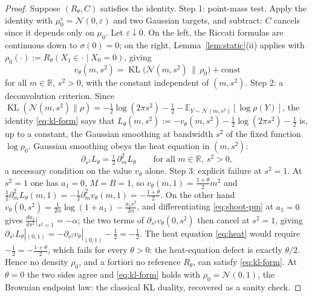 \documentclass[letterpaper,10pt,conference]{IEEEtran}
\newcommand{\KL}{\operatorname{KL}}
\newcommand{\EE}{\mathbb{E}}
\newcommand{\RR}{\mathbb{R}}
\newcommand{\cN}{\mathcal{N}}
\begin{document}
	\begin{proof}
		Suppose $(R_\theta,C)$ satisfies the identity. {Step 1: point-mass
			test.} Apply the identity with $\mu_0^\varepsilon=\cN(0,\varepsilon)$ and
		two Gaussian targets, and subtract: $C$ cancels since it depends only on
		$\mu_0$. Let $\varepsilon\downarrow0$. On the left, the Riccati formulas
		are continuous down to $\sigma(0)=0$; on the right,
		Lemma~\ref{lem:static}(ii) applies with
		$\rho_0(\cdot):=R_\theta(X_1\in\cdot\mid X_0=0)$, giving
		\begin{equation}
			\label{eq:kl-form}
			v_\theta(m,s^2)=\KL\bigl(\cN(m,s^2)\,\|\,\rho_0\bigr)+\mathrm{const}
		\end{equation}
		for all $m\in\RR$, $s^2>0$, with the constant independent of $(m,s^2)$. {Step 2: a deconvolution
			criterion.} Since
		$\KL(\cN(m,s^2)\|\rho)=-\tfrac12\log(2\pi s^2)-\tfrac12
		-\EE_{Y\sim\cN(m,s^2)}[\log\rho(Y)]$, the identity \eqref{eq:kl-form} says
		that
		$L_\theta(m,s^2):=-v_\theta(m,s^2)-\tfrac12\log(2\pi s^2)-\tfrac12$
		is, up to a constant, the Gaussian smoothing at bandwidth $s^2$ of the
		fixed function $\log\rho_0$. Gaussian smoothing obeys the heat
		equation in $(m,s^2)$:
		\begin{equation}
			\label{eq:heat}
			\partial_{s^2}L_\theta=\tfrac12\,\partial_m^2 L_\theta
			\qquad\text{for all }m\in\RR,\ s^2>0,
		\end{equation}
		a necessary condition on the value $v_\theta$ alone. {Step 3: explicit
			failure at $s^2=1$.} At $s^2=1$ one has $a_1=0$, $M=B=1$, so
		$v_\theta(m,1)=\frac{1+\theta}{2}m^2$ and $\tfrac12\partial_m^2
		L_\theta(m,1)=-\tfrac12\partial_m^2 v_\theta(m,1)=-\frac{1+\theta}{2}$.
		On the other hand $v_\theta(0,s^2)=\frac{1}{2\alpha}\log(1+a_1)-\frac{a_1
			s^2}{2\alpha}$, and differentiating \eqref{eq:shoot-pm} at $a_1=0$ gives
		$\frac{da_1}{ds^2}\big|_{s^2=1}=-\alpha$; the two terms of
		$\partial_{s^2}v_\theta(0,s^2)$ then cancel at $s^2=1$, giving
		$\partial_{s^2}L_\theta|_{(0,1)}=-\partial_{s^2}v_\theta|_{(0,1)}
		-\tfrac12=-\frac12$. The heat equation \eqref{eq:heat} would require
		$-\tfrac12=-\tfrac{1+\theta}{2}$, which fails for every $\theta>0$: the
		heat-equation defect is exactly $\theta/2$. Hence no density $\rho_0$, and
		{a fortiori} no reference $R_\theta$, can satisfy \eqref{eq:kl-form}.
		At $\theta=0$ the two sides agree and \eqref{eq:kl-form} holds with
		$\rho_0=\cN(0,1)$, the Brownian endpoint law: the classical KL duality, recovered as a sanity check.
	\end{proof}
	
\end{document}
